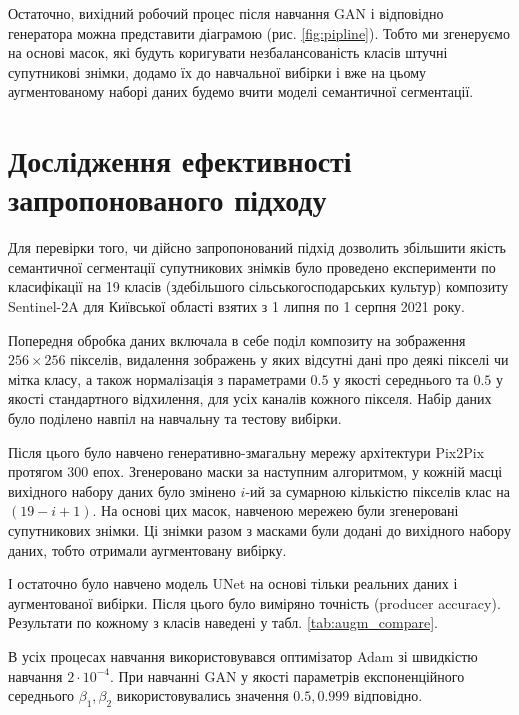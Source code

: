 \documentclass{ConfFTI}
\begin{document}
Остаточно, вихідний робочий процес після навчання GAN і відповідно генератора
можна представити діаграмою (рис. \ref{fig:pipline}). Тобто ми згенеруємо на основі масок, які будуть
коригувати незбалансованість класів штучні супутникові знімки,
додамо їх до навчальної вибірки і вже на цьому аугментованому
наборі даних будемо вчити моделі семантичної сегментації.

\section{Дослідження ефективності запропонованого підходу}

Для перевірки того, чи дійсно запропонований підхід
дозволить збільшити якість семантичної сегментації супутникових знімків
було проведено експерименти по класифікації на 19 класів
(здебільшого сільськогосподарських культур) композиту Sentinel-2A \cite{drusch2012sentinel}
для Київської області взятих з 1 липня по 1 серпня 2021 року.

Попередня обробка даних включала в себе поділ композиту на
зображення $256 \times 256$ пікселів, видалення зображень у яких
відсутні дані про деякі пікселі чи мітка класу, а також нормалізація з
параметрами $0.5$ у якості середнього та $0.5$ у якості стандартного відхилення,
для усіх каналів кожного пікселя. Набір даних було поділено навпіл
на навчальну та тестову вибірки.

Після цього було навчено генеративно-змагальну мережу архітектури
Pix2Pix протягом 300 епох. Згенеровано маски за наступним алгоритмом,
у кожній масці вихідного набору даних було змінено $i$-ий за сумарною кількістю
пікселів клас на $(19 - i + 1)$. На основі цих масок, навченою мережею
були згенеровані супутникових знімки. Ці знімки разом з масками були
додані до вихідного набору даних, тобто отримали аугментовану вибірку.

І остаточно було навчено модель UNet \cite{unet} на основі тільки реальних даних
і аугментованої вибірки. Після цього було виміряно точність (producer accuracy).
Результати по кожному з класів наведені у табл. \ref{tab:augm_compare}.

В усіх процесах навчання використовувався оптимізатор Adam \cite{diederik2014adam}
зі швидкістю навчання $2 \cdot 10^{-4}$. При навчанні GAN у якості параметрів
експоненційного середнього $\beta_1, \beta_2$ використовувались
значення $0.5, 0.999$ відповідно.
\end{document}
